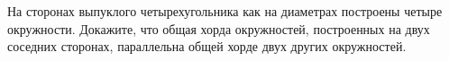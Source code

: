 \begin{ex}
	\begin{condition}
		На сторонах выпуклого четырехугольника как на диаметрах построены четыре окружности. Докажите, что общая хорда окружностей, построенных на двух соседних сторонах, параллельна общей хорде двух других окружностей.
	\end{condition}
\end{ex}
